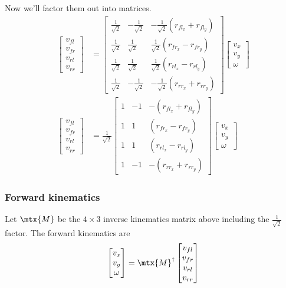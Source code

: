 Now we'll factor them out into matrices.
\begin{align}
  \begin{bmatrix}
    v_{fl} \\
    v_{fr} \\
    v_{rl} \\
    v_{rr}
  \end{bmatrix} &=
  \begin{bmatrix}
    \frac{1}{\sqrt{2}} & -\frac{1}{\sqrt{2}} &
      -\frac{1}{\sqrt{2}}(r_{fl_x} + r_{fl_y}) \\
    \frac{1}{\sqrt{2}} &  \frac{1}{\sqrt{2}} &
      \frac{1}{\sqrt{2}}(r_{fr_x} - r_{fr_y}) \\
    \frac{1}{\sqrt{2}} &  \frac{1}{\sqrt{2}} &
      \frac{1}{\sqrt{2}}(r_{rl_x} - r_{rl_y}) \\
    \frac{1}{\sqrt{2}} & -\frac{1}{\sqrt{2}} &
      -\frac{1}{\sqrt{2}}(r_{rr_x} + r_{rr_y})
  \end{bmatrix}
  \begin{bmatrix}
    v_x \\
    v_y \\
    \omega
  \end{bmatrix} \nonumber \\
  \begin{bmatrix}
    v_{fl} \\
    v_{fr} \\
    v_{rl} \\
    v_{rr}
  \end{bmatrix} &= \frac{1}{\sqrt{2}}
  \begin{bmatrix}
    1 & -1  & -(r_{fl_x} + r_{fl_y}) \\
    1 &  1  &  (r_{fr_x} - r_{fr_y}) \\
    1 &  1  &  (r_{rl_x} - r_{rl_y}) \\
    1 & -1  & -(r_{rr_x} + r_{rr_y})
  \end{bmatrix}
  \begin{bmatrix}
    v_x \\
    v_y \\
    \omega
  \end{bmatrix}
\end{align}

\subsubsection{Forward kinematics}

Let $\mtx{M}$ be the $4 \times 3$ inverse kinematics matrix above including the
$\frac{1}{\sqrt{2}}$ factor. The forward kinematics are
\begin{equation}
  \begin{bmatrix}
    v_x \\
    v_y \\
    \omega
  \end{bmatrix} =
  \mtx{M}^\dagger
  \begin{bmatrix}
    v_{fl} \\
    v_{fr} \\
    v_{rl} \\
    v_{rr}
  \end{bmatrix}
\end{equation}

